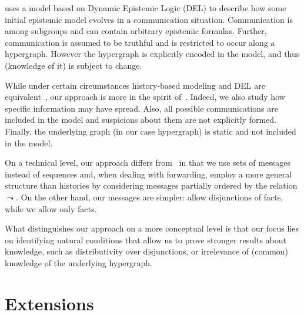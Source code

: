 \documentclass{article}
\let\cite\citep
\newcounter{#1}
\begin{document}
 uses a model based on Dynamic
Epistemic Logic (DEL) to describe how some initial epistemic
model evolves in a communication situation.  Communication is
among subgroups and can contain arbitrary epistemic formulas.
Further, communication is assumed to be truthful and is restricted to
occur along a hypergraph.
However the hypergraph is explicitly encoded in the model, and thus
(knowledge of it) is subject to change.


While under certain circumstances history-based modeling and DEL are
equivalent~\cite{van_benthem_merging_2007}, our approach is more
in the spirit of~\citet{pacuit_reasoning_2007}.
Indeed, we also study how specific information may have spread.
Also, all possible communications are included in the model
and suspicions about them are not explicitly formed.
Finally, the underlying graph (in our case hypergraph) is static
and not included in the model.

On a technical level, our approach differs from~\citet{pacuit_reasoning_2007}
in that we use sets of messages instead of sequences
and, when dealing with forwarding, employ a more general structure than histories
by considering messages partially ordered by the relation $\leadsto$.
On the other hand, our messages are simpler:
\citet{pacuit_reasoning_2007} allow disjunctions of facts, while we allow only facts.

What distinguishes our approach on a more conceptual level
is that our focus lies on identifying natural conditions that allow us to
prove stronger results about knowledge, such as distributivity over
disjunctions, or irrelevance of (common) knowledge of the underlying
hypergraph.



\section{Extensions}
\label{sec:extensions}
\end{document}
